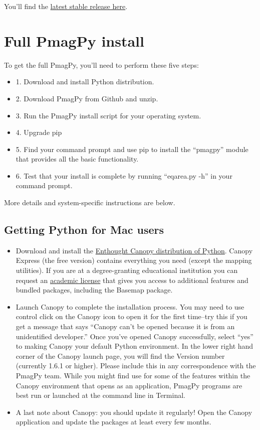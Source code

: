 \documentclass[11pt]{book}
\begin{document}
{You'll find the \href{https://github.com/PmagPy/PmagPy-Standalone-Windows/releases/latest}{latest stable release here}.


\section{Full PmagPy install}

To get the full PmagPy, you'll need to perform these five steps:

\begin{itemize}
  \item 1.  Download and install Python distribution.
  \item 2.  Download PmagPy from Github and unzip.
  \item 3.  Run the PmagPy install script for your operating system.
  \item 4.  Upgrade pip
  \item 5.  Find your command prompt and use pip to install the ``pmagpy'' module that provides all the basic functionality.
  \item 6.  Test that your install is complete by running ``eqarea.py -h'' in your command prompt.
\end{itemize}

More details and system-specific instructions are below.

 \subsection{Getting Python for Mac users}
   \begin{itemize}
   \item Download and install the \href{https://www.enthought.com/products/canopy/}{Enthought Canopy distribution of Python}. Canopy Express (the free version) contains everything you need (except the mapping utilities). If you are at a degree-granting educational institution you can request an \href{https://www.enthought.com/products/canopy/academic/}{academic license} that gives you access to additional features and bundled packages, including the Basemap package.
   \item Launch Canopy to complete the installation process.  You may need to use control click on the Canopy icon to open it for the first time--try this if you get a message that says ``Canopy can't be opened because it is from an unidentified developer.''  Once you've opened Canopy successfully, select ``yes'' to making Canopy your default Python environment.  In the lower right hand corner of the Canopy launch page, you will find the Version number (currently 1.6.1 or higher). Please include this in any correspondence with the PmagPy team. While you might find use for some of the features within the Canopy environment that opens as an application, PmagPy programs are best run or launched at the command line in Terminal.
   \item A last note about Canopy: you should update it regularly!  Open the Canopy application and update the packages at least every few months.
   \end{itemize}
}
\end{document}
